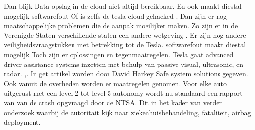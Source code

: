 \documentclass{article}
\begin{document}
	\cite{stumpff04052020TeslaPersonalData}
	Dan blijk Data-opslag in de cloud niet altijd bereikbaar.
	\cite{mitchell24022020AIDataTesla}
	En ook  maakt diestal mogelijk softwarefout
	\cite{kirk26112020modelX}
	Of is zelfs de tesla cloud gehacked
	\cite{hawkins22102022}.
	Dan zijn er nog maatschappelijke problemen die de aanpak moeilijker maken.
	Zo zijn er in de Verenigde Staten  verschillende staten een andere wetgeving
	\cite{berry21042021teslacrashtexas}
	\cite{hull23072021regulatorsaftercrash}
	\cite{wikiTeslaAutopilot}.
	Er zijn nog andere veiligheidsvraagstukken met betrekking tot de Tesla.
	softwarefout maakt diestal mogelijk
	\cite{kirk26112020modelX}
	Toch zijn er oplossingen en tegenmaatregelen.
	Tesla gaat advanced driver assistance systems inzetten met behulp van  passive visual, ultrasonic, en radar.
	\cite{tasking07062017TeslaAugmentedSafety},\cite{ackerman01072016TeslaImperfect}. In get artikel \cite{Harkey30052019SafeSystemVehicle} worden door David Harkey Safe system solutions gegeven.
	Ook vanuit de overheden worden er maatregelen genomen.
	Voor elke auto uitgerust met een level 2 tot level 5 autonomy wordt nu standaard een rapport van van de crash opgvraagd door de NTSA. Dit in het kader van verder onderzoek waarbij de autoritait kijk naar  ziekenhuisbehandeling, fataliteit, airbag deployment.
\end{document}
